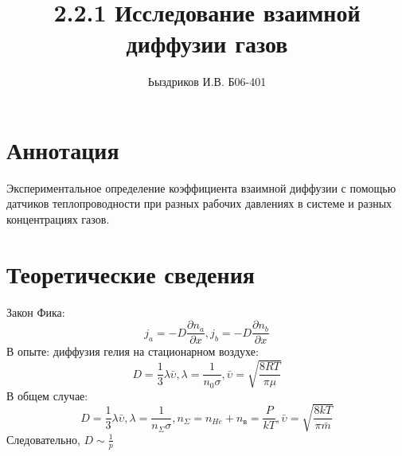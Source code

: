\documentclass[a4paper,12pt]{article} %
\author{Ьыздриков И.В. Б06-401}
\title{2.2.1 Исследование взаимной диффузии газов}
\date{}
\begin{document}
\maketitle
\section{Аннотация}
Экспериментальное определение коэффициента взаимной диффузии с помощью датчиков теплопроводности при разных рабочих давлениях в системе и разных концентрациях газов. 
\section{Теоретические сведения}
Закон Фика:
\begin{equation}
j_a=-D\frac{\partial n_a}{\partial x}, j_b=-D\frac{\partial n_b}{\partial x}
\end{equation}
В опыте: диффузия гелия на стационарном воздухе:
\begin{equation}
D=\frac{1}{3}\lambda \bar{\upsilon}, \lambda = \frac{1}{n_0\sigma}, \bar{\upsilon} = \sqrt{\frac{8RT}{\pi \mu}}
\end{equation}
В общем случае:
\begin{equation}
D = \frac{1}{3}\lambda \bar{\upsilon}, \lambda = \frac{1}{n_{\Sigma}\sigma}, n_{\Sigma} = n_{He}+n_{\text{в}}=\frac{P}{kT}, \bar{\upsilon} = \sqrt{\frac{8kT}{\pi \bar{m}}}
\end{equation}
Следовательно, $D\sim \frac{1}{p}$
\end{document}

